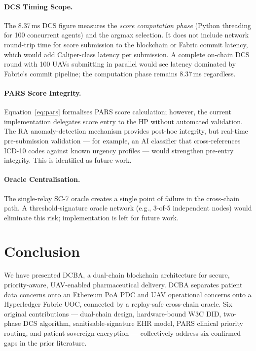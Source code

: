\documentclass[sigplan,screen]{acmart}
\newcommand{\dcba}{\textsc{DCBA}\xspace}
\newcommand{\pars}{\textsc{PARS}\xspace}
\begin{document}
\paragraph{DCS Timing Scope.}
The 8.37\,ms DCS figure measures the \emph{score computation phase}
(Python threading for 100 concurrent agents) and the argmax selection.
It does not include network round-trip time for score submission to the
blockchain or Fabric commit latency, which would add Caliper-class latency
per submission.
A complete on-chain DCS round with 100 UAVs submitting in parallel would
see latency dominated by Fabric's commit pipeline; the computation phase
remains 8.37\,ms regardless.

\paragraph{PARS Score Integrity.}
Equation~\eqref{eq:pars} formalises PARS score calculation; however,
the current implementation delegates score entry to the HP without
automated validation.
The RA anomaly-detection mechanism provides post-hoc integrity, but
real-time pre-submission validation — for example, an AI classifier that
cross-references ICD-10 codes against known urgency profiles — would
strengthen pre-entry integrity. This is identified as future work.

\paragraph{Oracle Centralisation.}
The single-relay SC-7 oracle creates a single point of failure in the
cross-chain path. A threshold-signature oracle network (e.g., 3-of-5
independent nodes) would eliminate this risk; implementation is left for
future work.

\section{Conclusion}\label{sec:conclusion}

We have presented \dcba, a dual-chain blockchain architecture for
secure, priority-aware, UAV-enabled pharmaceutical delivery.
\dcba separates patient data concerns onto an Ethereum PoA PDC and
UAV operational concerns onto a Hyperledger Fabric UOC, connected by a
replay-safe cross-chain oracle.
Six original contributions — dual-chain design, hardware-bound W3C DID,
two-phase DCS algorithm, sanitisable-signature EHR model, \pars clinical
priority routing, and patient-sovereign encryption — collectively address
six confirmed gaps in the prior literature.
\end{document}
